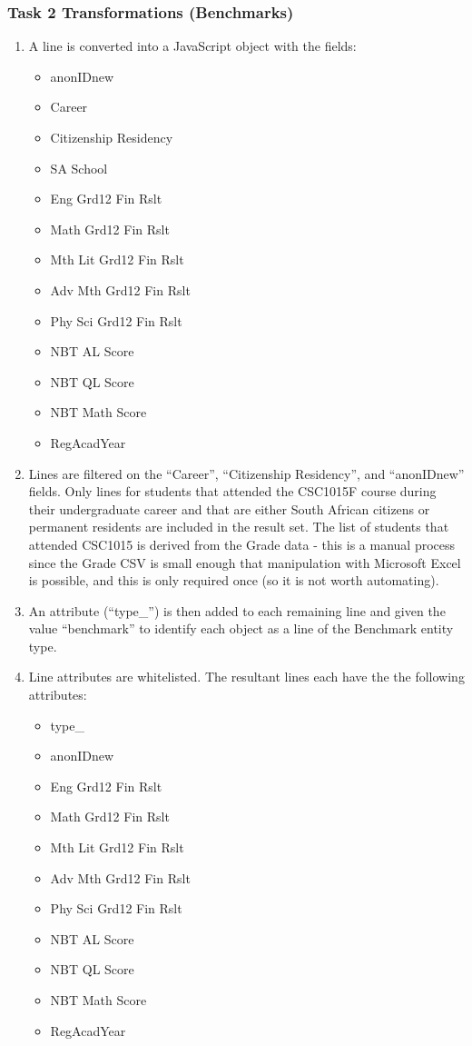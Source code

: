 \subsubsection{Task 2 Transformations (Benchmarks)}
\begin{enumerate}
  \item A line is converted into a JavaScript object with the fields:
        \begin{itemize}
          \item anonIDnew
          \item Career
          \item Citizenship Residency
          \item SA School
          \item Eng Grd12 Fin Rslt
          \item Math Grd12 Fin Rslt
          \item Mth Lit Grd12 Fin Rslt
          \item Adv Mth Grd12 Fin Rslt
          \item Phy Sci Grd12 Fin Rslt
          \item NBT AL Score
          \item NBT QL Score
          \item NBT Math Score
          \item RegAcadYear
        \end{itemize}
  \item Lines are filtered on the ``Career'', ``Citizenship Residency'', and ``anonIDnew'' fields. Only lines for students that attended the CSC1015F course during their undergraduate career and that are either South African citizens or permanent residents are included in the result set. The list of students that attended CSC1015 is derived from the Grade data - this is a manual process since the Grade CSV is small enough that manipulation with Microsoft Excel is possible, and this is only required once (so it is not worth automating).
  \item An attribute (``type\_'') is then added to each remaining line and given the value ``benchmark'' to identify each object as a line of the Benchmark entity type.
  \item Line attributes are whitelisted. The resultant lines each have the the following attributes:
        \begin{itemize}
          \item type\_
          \item anonIDnew
          \item Eng Grd12 Fin Rslt
          \item Math Grd12 Fin Rslt
          \item Mth Lit Grd12 Fin Rslt
          \item Adv Mth Grd12 Fin Rslt
          \item Phy Sci Grd12 Fin Rslt
          \item NBT AL Score
          \item NBT QL Score
          \item NBT Math Score
          \item RegAcadYear
        \end{itemize}
\end{enumerate}

